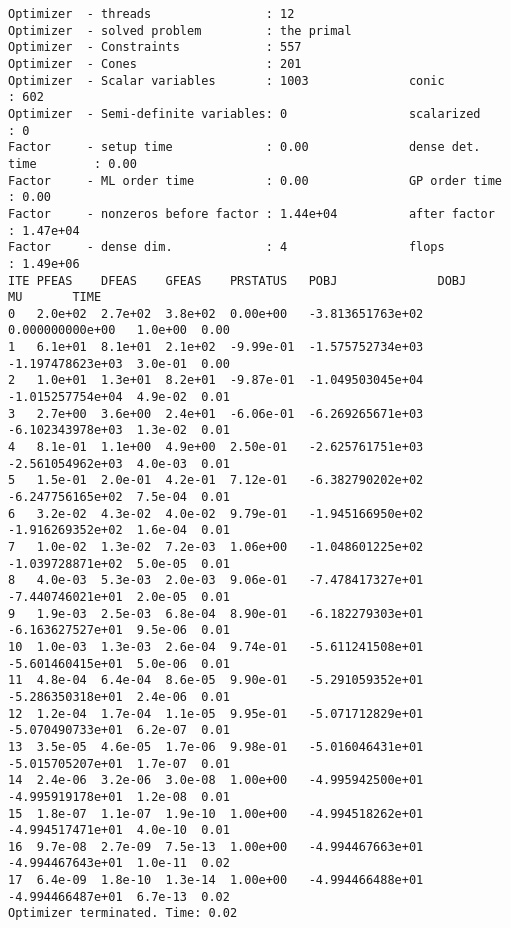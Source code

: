 \documentclass[
  10pt,
  a4paper,
,tablecaptionabove
]{scrartcl}
\begin{document}
\begin{verbatim}
Optimizer  - threads                : 12              
Optimizer  - solved problem         : the primal      
Optimizer  - Constraints            : 557
Optimizer  - Cones                  : 201
Optimizer  - Scalar variables       : 1003              conic                  : 602             
Optimizer  - Semi-definite variables: 0                 scalarized             : 0               
Factor     - setup time             : 0.00              dense det. time        : 0.00            
Factor     - ML order time          : 0.00              GP order time          : 0.00            
Factor     - nonzeros before factor : 1.44e+04          after factor           : 1.47e+04        
Factor     - dense dim.             : 4                 flops                  : 1.49e+06        
ITE PFEAS    DFEAS    GFEAS    PRSTATUS   POBJ              DOBJ              MU       TIME  
0   2.0e+02  2.7e+02  3.8e+02  0.00e+00   -3.813651763e+02  0.000000000e+00   1.0e+00  0.00  
1   6.1e+01  8.1e+01  2.1e+02  -9.99e-01  -1.575752734e+03  -1.197478623e+03  3.0e-01  0.00  
2   1.0e+01  1.3e+01  8.2e+01  -9.87e-01  -1.049503045e+04  -1.015257754e+04  4.9e-02  0.01  
3   2.7e+00  3.6e+00  2.4e+01  -6.06e-01  -6.269265671e+03  -6.102343978e+03  1.3e-02  0.01  
4   8.1e-01  1.1e+00  4.9e+00  2.50e-01   -2.625761751e+03  -2.561054962e+03  4.0e-03  0.01  
5   1.5e-01  2.0e-01  4.2e-01  7.12e-01   -6.382790202e+02  -6.247756165e+02  7.5e-04  0.01  
6   3.2e-02  4.3e-02  4.0e-02  9.79e-01   -1.945166950e+02  -1.916269352e+02  1.6e-04  0.01  
7   1.0e-02  1.3e-02  7.2e-03  1.06e+00   -1.048601225e+02  -1.039728871e+02  5.0e-05  0.01  
8   4.0e-03  5.3e-03  2.0e-03  9.06e-01   -7.478417327e+01  -7.440746021e+01  2.0e-05  0.01  
9   1.9e-03  2.5e-03  6.8e-04  8.90e-01   -6.182279303e+01  -6.163627527e+01  9.5e-06  0.01  
10  1.0e-03  1.3e-03  2.6e-04  9.74e-01   -5.611241508e+01  -5.601460415e+01  5.0e-06  0.01  
11  4.8e-04  6.4e-04  8.6e-05  9.90e-01   -5.291059352e+01  -5.286350318e+01  2.4e-06  0.01  
12  1.2e-04  1.7e-04  1.1e-05  9.95e-01   -5.071712829e+01  -5.070490733e+01  6.2e-07  0.01  
13  3.5e-05  4.6e-05  1.7e-06  9.98e-01   -5.016046431e+01  -5.015705207e+01  1.7e-07  0.01  
14  2.4e-06  3.2e-06  3.0e-08  1.00e+00   -4.995942500e+01  -4.995919178e+01  1.2e-08  0.01  
15  1.8e-07  1.1e-07  1.9e-10  1.00e+00   -4.994518262e+01  -4.994517471e+01  4.0e-10  0.01  
16  9.7e-08  2.7e-09  7.5e-13  1.00e+00   -4.994467663e+01  -4.994467643e+01  1.0e-11  0.02  
17  6.4e-09  1.8e-10  1.3e-14  1.00e+00   -4.994466488e+01  -4.994466487e+01  6.7e-13  0.02  
Optimizer terminated. Time: 0.02    


\end{verbatim}
\end{document}
